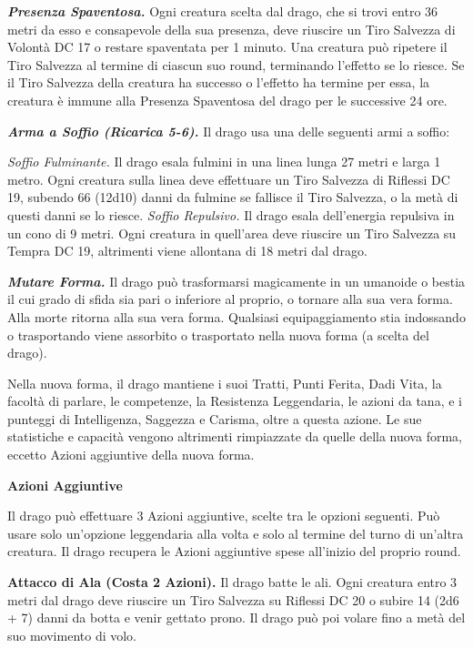 \begin{multicols}{2}
	\textit{\textbf{Presenza Spaventosa.}} Ogni creatura scelta dal drago, che si trovi entro 36 metri da esso e consapevole della sua presenza, deve riuscire un Tiro Salvezza di Volontà DC 17 o restare spaventata per 1 minuto. Una creatura può ripetere il Tiro Salvezza al termine di ciascun suo round, terminando l'effetto se lo riesce. Se il Tiro Salvezza della creatura ha successo o l'effetto ha termine per essa, la creatura è immune alla Presenza Spaventosa del drago per le successive 24 ore.

	\textit{\textbf{Arma a Soffio (Ricarica 5-6).}} Il drago usa una delle seguenti armi a soffio:

	\textit{Soffio Fulminante.} Il drago esala fulmini in una linea lunga 27 metri e larga 1 metro. Ogni creatura sulla linea deve effettuare un Tiro Salvezza di Riflessi DC 19, subendo 66 (12d10) danni da fulmine se fallisce il Tiro Salvezza, o la metà di questi danni se lo riesce. \textit{Soffio Repulsivo.} Il drago esala dell'energia repulsiva in un cono di 9 metri. Ogni creatura in quell'area deve riuscire un Tiro Salvezza su Tempra DC 19, altrimenti viene allontana di 18 metri dal drago.

	\textit{\textbf{Mutare Forma.}} Il drago può trasformarsi magicamente in un umanoide o bestia il cui grado di sfida sia pari o inferiore al proprio, o tornare alla sua vera forma. Alla morte ritorna alla sua vera forma. Qualsiasi equipaggiamento stia indossando o trasportando viene assorbito o trasportato nella nuova forma (a scelta del drago).

	Nella nuova forma, il drago mantiene i suoi Tratti, Punti Ferita, Dadi Vita, la facoltà di parlare, le competenze, la Resistenza Leggendaria, le azioni da tana, e i punteggi di Intelligenza, Saggezza e Carisma, oltre a questa azione. Le sue statistiche e capacità vengono altrimenti rimpiazzate da quelle della nuova forma, eccetto Azioni aggiuntive della nuova forma.

	\textbf{Azioni Aggiuntive}

	Il drago può effettuare 3 Azioni aggiuntive, scelte tra le opzioni seguenti. Può usare solo un'opzione leggendaria alla volta e solo al termine del turno di un'altra creatura. Il drago recupera le Azioni aggiuntive spese all'inizio del proprio round.

	\textbf{Attacco di Ala (Costa 2 Azioni).} Il drago batte le ali. Ogni creatura entro 3 metri dal drago deve riuscire un Tiro Salvezza su Riflessi DC 20 o subire 14 (2d6 + 7) danni da botta e venir gettato prono. Il drago può poi volare fino a metà del suo movimento di volo.


\end{multicols}
